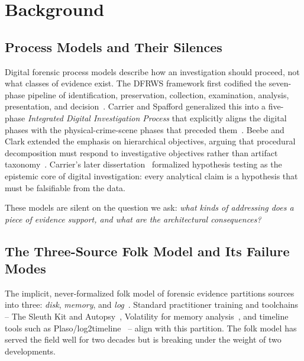 \section{Background}
\label{sec:bg}

\subsection{Process Models and Their Silences}

Digital forensic process models describe how an investigation should
proceed, not what classes of evidence exist. The DFRWS framework first
codified the seven-phase pipeline of identification, preservation,
collection, examination, analysis, presentation, and decision~\cite{palmer2001roadmap}.
Carrier and Spafford generalized this into a five-phase \emph{Integrated
Digital Investigation Process} that explicitly aligns the digital phases
with the physical-crime-scene phases that
preceded them~\cite{carrier2003getting}. Beebe and Clark extended the
emphasis on hierarchical objectives, arguing that procedural decomposition
must respond to investigative
objectives rather than artifact taxonomy~\cite{beebe2005hierarchical}.
Carrier's later dissertation~\cite{carrier2006hypothesis} formalized
hypothesis testing as the epistemic core of digital investigation: every
analytical claim is a hypothesis that must be falsifiable from the data.

These models are silent on the question we ask: \emph{what kinds of addressing
does a piece of evidence support, and what are the architectural consequences?}

\subsection{The Three-Source Folk Model and Its Failure Modes}

The implicit, never-formalized folk model of forensic evidence partitions
sources into three: \emph{disk}, \emph{memory}, and
\emph{log}~\cite{kent2006sp80086,casey2011digital,carrier2005file}. Standard
practitioner training and toolchains -- The Sleuth Kit and
Autopsy~\cite{carrier2005file}, Volatility for memory analysis~\cite{ligh2014artmemory,case2017memory},
and timeline tools such as Plaso/log2timeline~\cite{plaso} -- align with this
partition. The folk model has served the field well for two decades but is
breaking under the weight of two developments.

